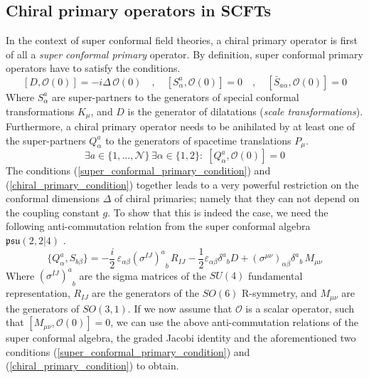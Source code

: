 \subsection{Chiral primary operators in SCFTs}
In the context of super conformal field theories, a chiral primary operator is first of all a \textit{super conformal primary} operator. By definition, super conformal primary operators have to satisfy the conditions.
%
%
\begin{equation}\label{super_conformal_primary_condition}
[D, \mathcal{O}(0)] = -i \Delta \, \mathcal{O}(0)
%
\quad , \quad
%
[S^a_\alpha, \mathcal{O}(0)] = 0
%
\quad , \quad
%
[\bar{S}_{a \dot{\alpha}}, \mathcal{O}(0)] = 0
\end{equation}
%
%
Where $S^a_\alpha$ are super-partners to the generators of special conformal transformations $K_\mu$, and $D$ is the generator of dilatations (\textit{scale transformations}). Furthermore, a chiral primary operator needs to be anihilated by at least one of the super-partners $Q^a_{\alpha}$ to the generators of spacetime translations $P_\mu$.
%
%
\begin{equation}\label{chiral_primary_condition}
\exists a \in \{1,\ldots,\mathcal{N} \} \, \exists \alpha \in \{1,2 \}: \;
[Q^a_\alpha, \mathcal{O}(0)] = 0
\end{equation}
%
%
The conditions (\ref{super_conformal_primary_condition}) and (\ref{chiral_primary_condition}) together leads to a very powerful restriction on the conformal dimensions $\Delta$ of chiral primaries; namely that they can not depend on the coupling constant $g$. To show that this is indeed the case, we need the following anti-commutation relation from the super conformal algebra $\mathfrak{psu}(2,2 | 4)$ \cite{Integrability Review}.
%
%
\begin{equation}\label{super conformal algebra 1}
\{ Q^a_\alpha, S_{b\beta} \}
=
-\frac{i}{2} \, \varepsilon_{\alpha \beta} {(\sigma^{IJ})^a}_b \, R_{IJ}
- \frac{1}{2} \varepsilon_{\alpha \beta} {\delta^a}_b D
+ (\sigma^{\mu \nu})_{\alpha \beta} {\delta^a}_b \, M_{\mu \nu}
\end{equation}
%
%
Where $ {(\sigma^{IJ})^a}_b$ are the sigma matrices of the $SU(4)$ fundamental representation, $R_{IJ}$ are the generators of the $SO(6)$ R-symmetry, and $M_{\mu \nu}$ are the generators of $SO(3,1)$. If we now assume that $\mathcal{O}$ is a scalar operator, such that $[M_{\mu \nu}, \mathcal{O}(0)] = 0$, we can use the above anti-commutation relations of the super conformal algebra, the graded Jacobi identity and the aforementioned two conditions (\ref{super_conformal_primary_condition}) and (\ref{chiral_primary_condition}) to obtain.

